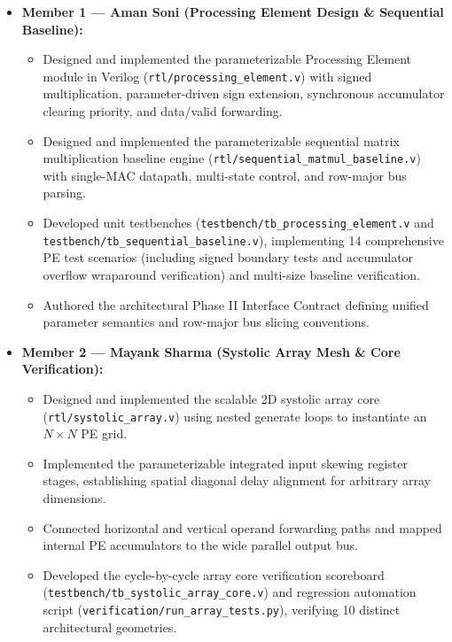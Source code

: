 \documentclass[conference]{IEEEtran}
\begin{document}
\begin{itemize}
    \item \textbf{Member 1 --- Aman Soni (Processing Element Design \& Sequential Baseline):}
    \begin{itemize}
        \item Designed and implemented the parameterizable Processing Element module in Verilog (\texttt{rtl/processing\_element.v}) with signed multiplication, parameter-driven sign extension, synchronous accumulator clearing priority, and data/valid forwarding.
        \item Designed and implemented the parameterizable sequential matrix multiplication baseline engine (\texttt{rtl/sequential\_matmul\_baseline.v}) with single-MAC datapath, multi-state control, and row-major bus parsing.
        \item Developed unit testbenches (\texttt{testbench/tb\_processing\_element.v} and \texttt{testbench/tb\_sequential\_baseline.v}), implementing 14 comprehensive PE test scenarios (including signed boundary tests and accumulator overflow wraparound verification) and multi-size baseline verification.
        \item Authored the architectural Phase II Interface Contract defining unified parameter semantics and row-major bus slicing conventions.
    \end{itemize}

    \item \textbf{Member 2 --- Mayank Sharma (Systolic Array Mesh \& Core Verification):}
    \begin{itemize}
        \item Designed and implemented the scalable 2D systolic array core (\texttt{rtl/systolic\_array.v}) using nested generate loops to instantiate an $N \times N$ PE grid.
        \item Implemented the parameterizable integrated input skewing register stages, establishing spatial diagonal delay alignment for arbitrary array dimensions.
        \item Connected horizontal and vertical operand forwarding paths and mapped internal PE accumulators to the wide parallel output bus.
        \item Developed the cycle-by-cycle array core verification scoreboard (\texttt{testbench/tb\_systolic\_array\_core.v}) and regression automation script (\texttt{verification/run\_array\_tests.py}), verifying 10 distinct architectural geometries.
    \end{itemize}


\end{itemize}
\end{document}
